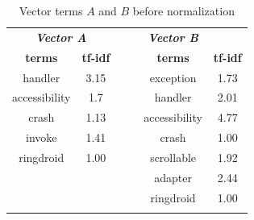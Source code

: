 \begin{table}[tb]
\centering
\caption{Vector terms $A$ and $B$ before normalization}
\label{tbl: beforenormal}
\begin{tabular}{ccllcc}
\cline{1-2} \cline{5-6}
\multicolumn{2}{|c|}{{\color[HTML]{000000} \textit{\textbf{Vector A}}}}     &  & \multicolumn{1}{l|}{} & \multicolumn{1}{c|}{{\color[HTML]{000000} \textit{\textbf{Vector B}}}} & \multicolumn{1}{c|}{}                \\ \cline{1-2} \cline{5-6} 
\multicolumn{1}{|c|}{\textbf{terms}} & \multicolumn{1}{c|}{\textbf{tf-idf}} &  & \multicolumn{1}{l|}{} & \multicolumn{1}{c|}{\textbf{terms}}                                    & \multicolumn{1}{c|}{\textbf{tf-idf}} \\ \cline{1-2} \cline{5-6} 
\multicolumn{1}{|c|}{handler}        & \multicolumn{1}{c|}{3.15}            &  & \multicolumn{1}{l|}{} & \multicolumn{1}{c|}{exception}                                         & \multicolumn{1}{c|}{1.73}            \\ \cline{1-2} \cline{5-6} 
\multicolumn{1}{|c|}{accessibility}  & \multicolumn{1}{c|}{1.7}             &  & \multicolumn{1}{l|}{} & \multicolumn{1}{c|}{handler}                                           & \multicolumn{1}{c|}{2.01}            \\ \cline{1-2} \cline{5-6} 
\multicolumn{1}{|c|}{crash}          & \multicolumn{1}{c|}{1.13}            &  & \multicolumn{1}{l|}{} & \multicolumn{1}{c|}{accessibility}                                     & \multicolumn{1}{c|}{4.77}            \\ \cline{1-2} \cline{5-6} 
\multicolumn{1}{|c|}{invoke}         & \multicolumn{1}{c|}{1.41}            &  & \multicolumn{1}{l|}{} & \multicolumn{1}{c|}{crash}                                             & \multicolumn{1}{c|}{1.00}            \\ \cline{1-2} \cline{5-6} 
\multicolumn{1}{|c|}{ringdroid}      & \multicolumn{1}{c|}{1.00}            &  & \multicolumn{1}{l|}{} & \multicolumn{1}{c|}{scrollable}                                        & \multicolumn{1}{c|}{1.92}            \\ \cline{1-2} \cline{5-6} 
                                     & \textbf{}                            &  & \multicolumn{1}{l|}{} & \multicolumn{1}{c|}{adapter}                                           & \multicolumn{1}{c|}{2.44}            \\ \cline{5-6} 
                                     &                                      &  & \multicolumn{1}{l|}{} & \multicolumn{1}{c|}{ringdroid}                                         & \multicolumn{1}{c|}{1.00}   \\ \cline{5-6} 
                                     &                                      &  &                       &                                                                        &                                     
\end{tabular}
\end{table}

